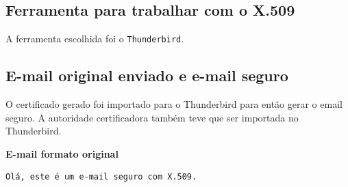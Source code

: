 \documentclass[
    article,            %
    11pt,               %
    oneside,            %
    a4paper,            %
    english,            %
    brazil,             %
    sumario=tradicional,
    ]{abntex2}
\begin{document}
\subsection{\textbf{Ferramenta para trabalhar com o X.509}}

A ferramenta escolhida foi o \texttt{Thunderbird}.

\subsection{\textbf{E-mail original enviado e e-mail seguro}}

O certificado gerado foi importado para o Thunderbird para então gerar o email seguro.
A autoridade certificadora também teve que ser importada no Thunderbird.

    \textbf{E-mail formato original}
    \begin{Verbatim}[frame=single, commandchars=\\\{\}, fontsize=\footnotesize]
                            Olá, este é um e-mail seguro com X.509.
    \end{Verbatim}
\end{document}
